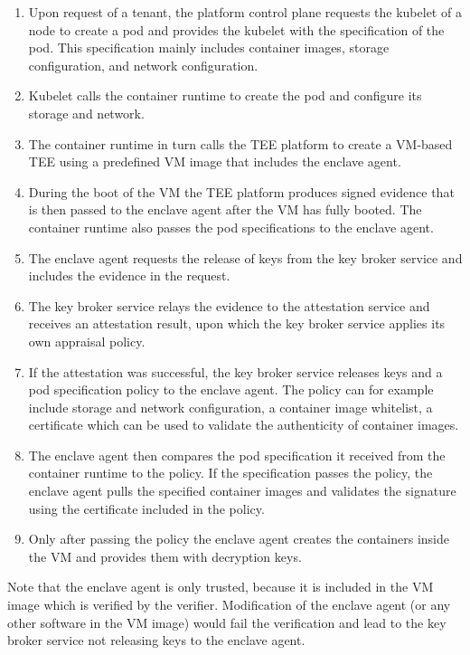 \begin{enumerate}
  \item Upon request of a tenant, the platform control plane requests the
        kubelet of a node to create a pod and provides the kubelet with the
        specification of the pod. This specification mainly includes container
        images, storage configuration, and network configuration.
  \item Kubelet calls the container runtime to create the pod and configure its
        storage and network.
  \item The container runtime in turn calls the TEE platform to create a
        VM-based TEE using a predefined VM image that includes the enclave
        agent.
  \item During the boot of the VM the TEE platform produces signed evidence that
        is then passed to the enclave agent after the VM has fully booted. The
        container runtime also passes the pod specifications to the enclave
        agent.
  \item The enclave agent requests the release of keys from the key broker
        service and includes the evidence in the request.
  \item The key broker service relays the evidence to the attestation service
        and receives an attestation result, upon which the key broker service
        applies its own appraisal policy.
  \item If the attestation was successful, the key broker service releases keys
        and a pod specification policy to the enclave agent. The policy can for
        example include storage and network configuration, a container image
        whitelist, a certificate which can be used to validate the authenticity
        of container images.
  \item The enclave agent then compares the pod specification it received from
        the container runtime to the policy. If the specification passes the
        policy, the enclave agent pulls the specified container images and
        validates the signature using the certificate included in the policy.
  \item Only after passing the policy the enclave agent creates the containers
        inside the VM and provides them with decryption keys.
\end{enumerate}

Note that the enclave agent is only trusted, because it is included in the VM
image which is verified by the verifier. Modification of the enclave agent (or
any other software in the VM image) would fail the verification and lead to the
key broker service not releasing keys to the enclave agent.
